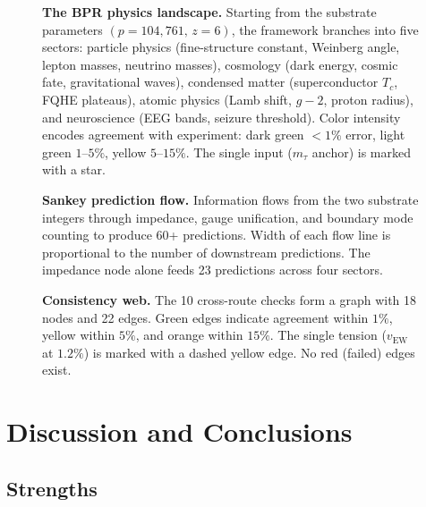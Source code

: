 \documentclass[aps,prd,twocolumn,superscriptaddress,longbibliography,nofootinbib]{revtex4-2}
\newcommand{\vEW}{v_{\mathrm{EW}}}
\begin{document}

\begin{figure}[b]
\caption{\label{fig:landscape}%
\textbf{The BPR physics landscape.}  Starting from the substrate
parameters $(p = 104{,}761,\, z = 6)$, the framework branches into
five sectors: particle physics (fine-structure constant, Weinberg
angle, lepton masses, neutrino masses), cosmology (dark energy,
cosmic fate, gravitational waves), condensed matter (superconductor
$T_c$, FQHE plateaus), atomic physics (Lamb shift, $g-2$, proton
radius), and neuroscience (EEG bands, seizure threshold).  Color
intensity encodes agreement with experiment: dark green $< 1\%$
error, light green $1$--$5\%$, yellow $5$--$15\%$.  The single
input ($m_\tau$ anchor) is marked with a star.}
\end{figure}

\begin{figure}[t]
\caption{\label{fig:sankey}%
\textbf{Sankey prediction flow.}  Information flows from the two
substrate integers through impedance, gauge unification, and
boundary mode counting to produce 60+ predictions.  Width of each
flow line is proportional to the number of downstream predictions.
The impedance node alone feeds 23 predictions across four sectors.}
\end{figure}

\begin{figure}[b]
\caption{\label{fig:consistency}%
\textbf{Consistency web.}  The 10 cross-route checks form a graph
with 18 nodes and 22 edges.  Green edges indicate agreement within
$1\%$, yellow within $5\%$, and orange within $15\%$.  The single
tension ($\vEW$ at $1.2\%$) is marked with a dashed yellow edge.
No red (failed) edges exist.}
\end{figure}


\section{Discussion and Conclusions}
\label{sec:discussion}

\subsection{Strengths}
\end{document}
